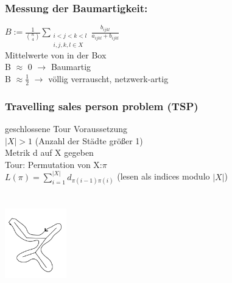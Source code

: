 \subsubsection{Messung der Baumartigkeit:}
$B:=\frac{1}{\binom{n}{4}} \displaystyle\sum_{\substack{i<j<k<l \\ i,j,k,l \in X}} \frac{b_{ijkl}}{a_{ijkl} + b_{ijkl}}$\\
Mittelwerte von in der Box\\
B $\approx$ 0 $\rightarrow$ Baumartig\\
B $\approx \frac{1}{2}$ $\rightarrow$ völlig verrauscht, netzwerk-artig\\

\subsubsection{Travelling sales person problem (TSP)}
geschlossene Tour Voraussetzung\\
$|X|>1$ (Anzahl der Städte größer 1)\\
Metrik d auf X gegeben\\
Tour: Permutation von X:$\pi$\\
$L(\pi)=\displaystyle\sum_{i=1}^{|X|}d_{\pi(i-1)\pi(i)}$ (lesen als indices modulo $|X|$)
\\\\
\\
\includegraphics[width=0.2\textwidth]{lectures/161216/pix/6.jpg}\\

